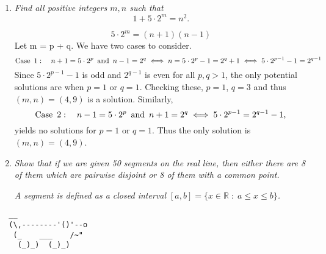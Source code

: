 \documentclass{article}
\begin{document}
\begin{enumerate}
\item %
\textit{Find all positive integers $m, n$ such that \[ 1 + 5 \cdot 2^m = n^2. \]}

\[ 5 \cdot 2^m = (n+1)(n-1) \]
Let m = p + q. We have two cases to consider.
 \[ \mathrm{Case} \enskip 1: \quad n + 1 = 5 \cdot 2^p \enskip \mathrm{and} \enskip n - 1 = 2^q
 \iff n = 5 \cdot 2^p - 1 = 2^q + 1
 \iff 5 \cdot 2^{p-1} - 1 = 2^{q-1} \]
Since $5 \cdot 2^{p-1} - 1$ is odd and $2^{q-1}$ is even for all $p, q > 1$, the only potential solutions are when $p = 1$ or $q = 1$. Checking these, $p = 1$, $q = 3$ and thus $(m, n) = (4, 9)$ is a solution. Similarly,
\[ \mathrm{Case} \enskip 2: \quad n - 1 = 5 \cdot 2^p \enskip \mathrm{and} \enskip n + 1 = 2^q 
\iff 5 \cdot 2^{p-1} = 2^{q-1} - 1, \] yields no solutions for $p = 1$ or $q = 1$. Thus the only solution is $(m, n) = (4, 9)$.

\vspace{12pt}
\item %
\textit{Show that if we are given 50 segments on the real line, then either there are 8 of them which are pairwise disjoint or 8 of them with a common point.}

\textit{A segment is defined as a closed interval $[a, b] = \{x \in \mathbb{R} \;:\; a \leq x \leq b \}$.}




\end{enumerate}


\vspace{12pt}
\begin{center}
\begin{BVerbatim}
  __
  (\,--------'()'--o
   (_    ___    /~"
    (_)_)  (_)_)
\end{BVerbatim}
\end{center}
\end{document}
